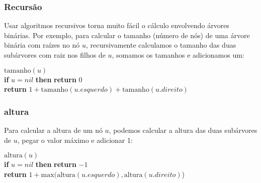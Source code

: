 \documentclass{beamer}
\begin{document}
\begin{frame}
\frametitle{Recursão}
Usar algoritmos recursivos torna muito fácil o cálculo envolvendo árvores binárias. Por exemplo, para calcular o tamanho (número de nós) de uma
árvore binária com raízes no nó \ensuremath{\ensuremath{\ensuremath{\mathit{u}}}}, recursivamente calculamos o tamanho
das duas subárvores com raiz nos filhos de \ensuremath{\ensuremath{\ensuremath{\mathit{u}}}}, somamos os tamanhos e adicionamos um:

\begin{oframed}
\begin{flushleft}
\hspace*{1em} \ensuremath{\mathrm{tamanho}(\ensuremath{\mathit{u}})}\\
\hspace*{1em} \hspace*{1em} {\color{black} \textbf{if}} \ensuremath{\ensuremath{\mathit{u}} = nil} {\color{black} \textbf{then}}  {\color{black} \textbf{return}} \ensuremath{0}\\
\hspace*{1em} \hspace*{1em} {\color{black} \textbf{return}} \ensuremath{1 + \mathrm{tamanho}(\ensuremath{\mathit{u}}.\ensuremath{\mathit{esquerdo}}) + \mathrm{tamanho}(\ensuremath{\mathit{u}}.\ensuremath{\mathit{direito}})}\\
\end{flushleft}
\end{oframed}
\end{frame}

\begin{frame}
\frametitle{altura}
Para calcular a altura de um nó \ensuremath{\ensuremath{\ensuremath{\mathit{u}}}}, podemos calcular a altura das duas subárvores de \ensuremath{\ensuremath{\ensuremath{\mathit{u}}}}, pegar o valor máximo e adicionar 1:

\begin{oframed}
\begin{flushleft}
\hspace*{1em} \ensuremath{\mathrm{altura}(\ensuremath{\mathit{u}})}\\
\hspace*{1em} \hspace*{1em} {\color{black} \textbf{if}} \ensuremath{\ensuremath{\mathit{u}} = nil} {\color{black} \textbf{then}}  {\color{black} \textbf{return}} \ensuremath{-1}\\
\hspace*{1em} \hspace*{1em} {\color{black} \textbf{return}} \ensuremath{1 + \mathrm{max}(\mathrm{altura}(\ensuremath{\mathit{u}}.\ensuremath{\mathit{esquerdo}}), \mathrm{altura}(\ensuremath{\mathit{u}}.\ensuremath{\mathit{direito}})})\\
\end{flushleft}
\end{oframed}
\end{frame}
\end{document}
